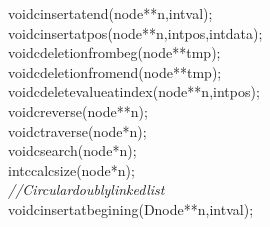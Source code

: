 \documentclass[a4paper, 9pt]{article}
\newcommand\SPC{\hspace*{0.6em}}
\newcommand{\CppAComment}[1]{\textit{\textcolor[rgb]{0.4,0.45,0.48}{#1}}}
\newcommand{\CppAIdentifier}[1]{\textcolor[rgb]{0.88,0.89,0.89}{#1}}
\newcommand{\CppAReservedWord}[1]{\textcolor[rgb]{0.4,0.55,0.69}{#1}}
\newcommand{\CppASpace}[1]{\colorbox[rgb]{0.16,0.19,0.2}{#1}}
\newcommand{\CppASymbol}[1]{\textcolor[rgb]{0.91,0.89,0.72}{#1}}
\begin{document}
\begin{ttfamily}
\CppAReservedWord{void}\CppASpace{\SPC }\CppAIdentifier{cinsertatend}\CppASymbol{(}\CppASpace{\SPC }\CppAIdentifier{node}\CppASymbol{*}\CppASymbol{*}\CppASpace{\SPC }\CppAIdentifier{n}\CppASymbol{,}\CppAReservedWord{int}\CppASpace{\SPC }\CppAIdentifier{val}\CppASymbol{)}\CppASymbol{;}\\
\CppAReservedWord{void}\CppASpace{\SPC }\CppAIdentifier{cinsertatpos}\CppASymbol{(}\CppAIdentifier{node}\CppASymbol{*}\CppASymbol{*}\CppASpace{\SPC }\CppAIdentifier{n}\CppASymbol{,}\CppAReservedWord{int}\CppASpace{\SPC }\CppAIdentifier{pos}\CppASymbol{,}\CppAReservedWord{int}\CppASpace{\SPC }\CppAIdentifier{data}\CppASymbol{)}\CppASymbol{;}\\
\CppAReservedWord{void}\CppASpace{\SPC }\CppAIdentifier{cdeletionfrombeg}\CppASymbol{(}\CppAIdentifier{node}\CppASymbol{*}\CppASymbol{*}\CppASpace{\SPC }\CppAIdentifier{tmp}\CppASpace{\SPC }\CppASymbol{)}\CppASymbol{;}\\
\CppAReservedWord{void}\CppASpace{\SPC }\CppAIdentifier{cdeletionfromend}\CppASymbol{(}\CppAIdentifier{node}\CppASymbol{*}\CppASymbol{*}\CppASpace{\SPC }\CppAIdentifier{tmp}\CppASpace{\SPC }\CppASymbol{)}\CppASymbol{;}\\
\CppAReservedWord{void}\CppASpace{\SPC }\CppAIdentifier{cdeletevalueatindex}\CppASymbol{(}\CppAIdentifier{node}\CppASymbol{*}\CppASymbol{*}\CppASpace{\SPC }\CppAIdentifier{n}\CppASymbol{,}\CppAReservedWord{int}\CppASpace{\SPC }\CppAIdentifier{pos}\CppASymbol{)}\CppASymbol{;}\\
\CppAReservedWord{void}\CppASpace{\SPC }\CppAIdentifier{creverse}\CppASymbol{(}\CppAIdentifier{node}\CppASymbol{*}\CppASymbol{*}\CppASpace{\SPC }\CppAIdentifier{n}\CppASymbol{)}\CppASymbol{;}\\
\CppAReservedWord{void}\CppASpace{\SPC }\CppAIdentifier{ctraverse}\CppASymbol{(}\CppAIdentifier{node}\CppASymbol{*}\CppASpace{\SPC }\CppAIdentifier{n}\CppASymbol{)}\CppASymbol{;}\\
\CppAReservedWord{void}\CppASpace{\SPC }\CppAIdentifier{csearch}\CppASymbol{(}\CppAIdentifier{node}\CppASymbol{*}\CppASpace{\SPC }\CppAIdentifier{n}\CppASymbol{)}\CppASymbol{;}\\
\CppAReservedWord{int}\CppASpace{\SPC }\CppAIdentifier{ccalcsize}\CppASymbol{(}\CppAIdentifier{node}\CppASpace{\SPC }\CppASymbol{*}\CppAIdentifier{n}\CppASymbol{)}\CppASymbol{;}\\
\CppAComment{//Circulardoublylinkedlist}\\
\CppAReservedWord{void}\CppASpace{\SPC }\CppAIdentifier{cinsertatbegining}\CppASymbol{(}\CppASpace{\SPC }\CppAIdentifier{Dnode}\CppASymbol{*}\CppASymbol{*}\CppASpace{\SPC }\CppAIdentifier{n}\CppASymbol{,}\CppAReservedWord{int}\CppASpace{\SPC }\CppAIdentifier{val}\CppASymbol{)}\CppASymbol{;}\\

\end{ttfamily}
\end{document}
